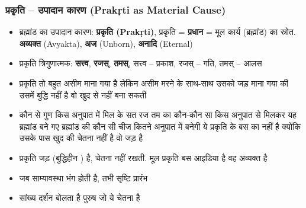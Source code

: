 \begin{frame}[fragile]\frametitle{प्रकृति – उपादान कारण (Prakṛti as Material Cause)}

      \begin{itemize}
        \item ब्रह्मांड का उपादान कारण: \textbf{प्रकृति (Prakṛti)},         प्रकृति = \textbf{प्रधान} = मूल कार्य (ब्रह्मांड) का स्रोत. \textbf{अव्यक्त} (Avyakta), \textbf{अज} (Unborn), \textbf{अनादि} (Eternal)
        \item प्रकृति त्रिगुणात्मक: \textbf{सत्त्व}, \textbf{रजस्}, \textbf{तमस्}, सत्त्व – प्रकाश, रजस् – गति, तमस् – आलस 
		\item प्रकृति तो बहुत असीम माना गया है लेकिन असीम मरने के साथ-साथ उसको जड़ माना गया की उसमें बुद्धि नहीं है वो खुद से नहीं बना सकती 
		\item कौन से गुण किस अनुपात में मिल के सत रज  तम का कौन-कौन सा किस अनुपात से मिलकर यह ब्रह्मांड बने गए
ब्रह्मांड की कौन सी चीज कितने अनुपात में बनेगी ये प्रकृति के बस का नहीं है क्योंकि उसके पास खुद की चेतना नहीं है वो जड़ है 
        \item प्रकृति जड़ (बुद्धिहीन ) है, चेतना नहीं रखती. मूल प्रकृति बस आइडिया है वह अव्यक्त है 
        \item जब साम्यावस्था भंग होती है, तभी सृष्टि प्रारंभ
		\item सांख्य दर्शन बोलता है पुरुष जो ये चेतना है  
	
      \end{itemize}

\end{frame}

